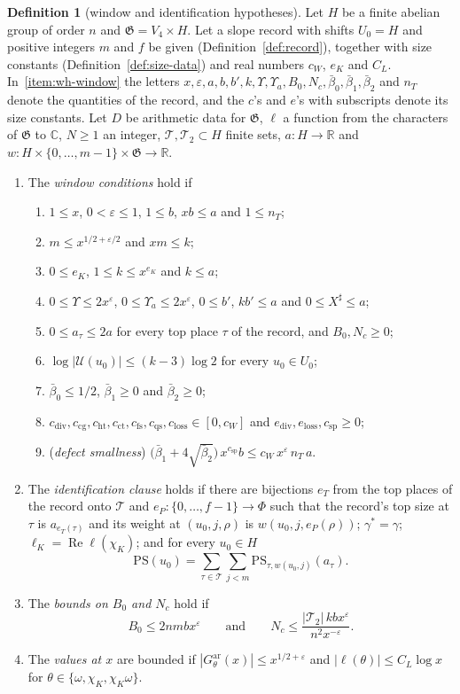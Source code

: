 \documentclass[11pt]{amsbook}
\theoremstyle{plain}
\theoremstyle{definition}
\newtheorem{definition}[theorem]{Definition}
\theoremstyle{remark}
\numberwithin{equation}{section}
\numberwithin{figure}{chapter}
\numberwithin{table}{chapter}
\newcommand{\R}{\mathbb{R}}
\renewcommand{\C}{\mathbb{C}}
\newcommand{\eps}{\varepsilon}
\newcommand{\GG}{\mathfrak{G}}
\newcommand{\GPsi}{G^{\mathrm{ar}}}
\newcommand{\PS}{\mathrm{PS}}
\newcommand{\Top}{\mathcal{T}}
\newcommand{\Words}{\mathcal{U}}
\begin{document}
\begin{definition}[window and identification hypotheses]
\label{def:window-hyps}
Let $H$ be a finite abelian group of order $n$ and $\GG=V_4\times H$.
Let a slope record with shifts $U_0=H$ and positive integers $m$ and
$f$ be given (Definition~\ref{def:record}), together with size
constants (Definition~\ref{def:size-data}) and real numbers $c_W$,
$e_K$ and $C_L$. In~\ref{item:wh-window} the letters
$x,\eps,a,b,b',k,\Upsilon,\Upsilon_a,B_0,N_c,\bar\beta_0,\bar\beta_1,
\bar\beta_2$ and $n_T$ denote the quantities of the record, and the
$c$'s and $e$'s with subscripts denote its size constants.
Let $D$ be arithmetic data for $\GG$, $\ell$ a
function from the characters of $\GG$ to $\C$, $N\ge1$ an integer,
$\Top,\Top_2\subset H$ finite sets, $a\colon H\to\R$ and
$w\colon H\times\{0,\dots,m-1\}\times\GG\to\R$.
\begin{enumerate}[label=(\arabic*)]
\item\label{item:wh-window} The \emph{window conditions} hold if
\begin{enumerate}[label=(\alph*)]
\item $1\le x$, $0<\eps\le1$, $1\le b$, $xb\le a$ and $1\le n_T$;
\item $m\le x^{1/2+\eps/2}$ and $xm\le k$;
\item $0\le e_K$, $1\le k\le x^{e_K}$ and $k\le a$;
\item $0\le\Upsilon\le2x^\eps$, $0\le\Upsilon_a\le2x^\eps$, $0\le b'$,
$kb'\le a$ and $0\le X^\sharp\le a$;
\item $0\le a_\tau\le2a$ for every top place $\tau$ of the record, and
$B_0,N_c\ge0$;
\item $\log|\Words(u_0)|\le(k-3)\log2$ for every $u_0\in U_0$;
\item $\bar\beta_0\le1/2$, $\bar\beta_1\ge0$ and $\bar\beta_2\ge0$;
\item $c_{\mathrm{div}},c_{\mathrm{cg}},c_{\mathrm{ht}},c_{\mathrm{ct}},
c_{\mathrm{fs}},c_{\mathrm{qs}},c_{\mathrm{loss}}\in[0,c_W]$ and
$e_{\mathrm{div}},e_{\mathrm{loss}},c_{\mathrm{sp}}\ge0$;
\item\label{item:wh-defect} (\emph{defect smallness})
$\bigl(\bar\beta_1+4\sqrt{\bar\beta_2}\bigr)\,x^{c_{\mathrm{sp}}}b\le
c_W\,x^\eps\,n_T\,a$.
\end{enumerate}
\item The \emph{identification clause} holds if there are bijections
$e_T$ from the top places of the record onto $\Top$ and
$e_P\colon\{0,\dots,f-1\}\to\Phi$
such that the record's top size at $\tau$ is $a_{e_T(\tau)}$ and its
weight at $(u_0,j,\rho)$ is $w(u_0,j,e_P(\rho))$; $\gamma^*=\gamma$;
$\ell_K=\operatorname{Re}\ell(\chi_K)$; and for every $u_0\in H$
\[
\PS(u_0)=\sum_{\tau\in\Top}\sum_{j<m}\PS_{\tau,w(u_0,j)}(a_\tau).
\]
\item The \emph{bounds on $B_0$ and $N_c$} hold if
\[
B_0\le2nmbx^\eps\qquad\text{and}\qquad
N_c\le\frac{|\Top_2|\,kbx^\eps}{n^2x^{-\eps}}.
\]
\item The \emph{values at $x$} are bounded if
$|\GPsi_\theta(x)|\le x^{1/2+\eps}$ and $|\ell(\theta)|\le C_L\log x$
for $\theta\in\{\omega,\chi_K,\chi_K\omega\}$.
\end{enumerate}
\end{definition}
\end{document}
